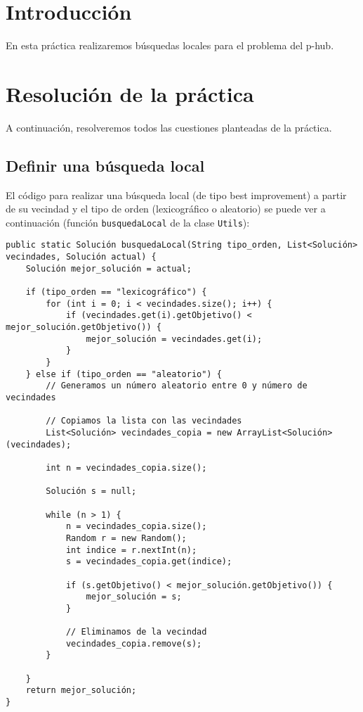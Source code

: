 \documentclass[12pt,a4paper,twoside,openright,titlepage,final]{article}
\author{José Ignacio Escribano}
\begin{document}
\setcounter{page}{1}


\listoftables
\thispagestyle{empty}
\newpage

\tableofcontents
\thispagestyle{empty}
\newpage


\setcounter{page}{1}

\section{Introducción}

En esta práctica realizaremos búsquedas locales para el problema del p-hub.

\section{Resolución de la práctica}

A continuación, resolveremos todos las cuestiones planteadas de la práctica.

\subsection{Definir una búsqueda local}

El código para realizar una búsqueda local (de tipo best improvement) a partir de su vecindad y el tipo de orden (lexicográfico o aleatorio) se puede ver a continuación (función \texttt{busquedaLocal} de la clase \texttt{Utils}):

\begin{verbatim}
public static Solución busquedaLocal(String tipo_orden, List<Solución> vecindades, Solución actual) {
    Solución mejor_solución = actual;

    if (tipo_orden == "lexicográfico") {
        for (int i = 0; i < vecindades.size(); i++) {
            if (vecindades.get(i).getObjetivo() < mejor_solución.getObjetivo()) {
                mejor_solución = vecindades.get(i);
            }
        }
    } else if (tipo_orden == "aleatorio") {
        // Generamos un número aleatorio entre 0 y número de vecindades

        // Copiamos la lista con las vecindades
        List<Solución> vecindades_copia = new ArrayList<Solución>(vecindades);

        int n = vecindades_copia.size();

        Solución s = null;

        while (n > 1) {
            n = vecindades_copia.size();
            Random r = new Random();
            int indice = r.nextInt(n);
            s = vecindades_copia.get(indice);

            if (s.getObjetivo() < mejor_solución.getObjetivo()) {
                mejor_solución = s;
            }

            // Eliminamos de la vecindad
            vecindades_copia.remove(s);
        }

    }
    return mejor_solución;
}
\end{verbatim} 
\end{document}
